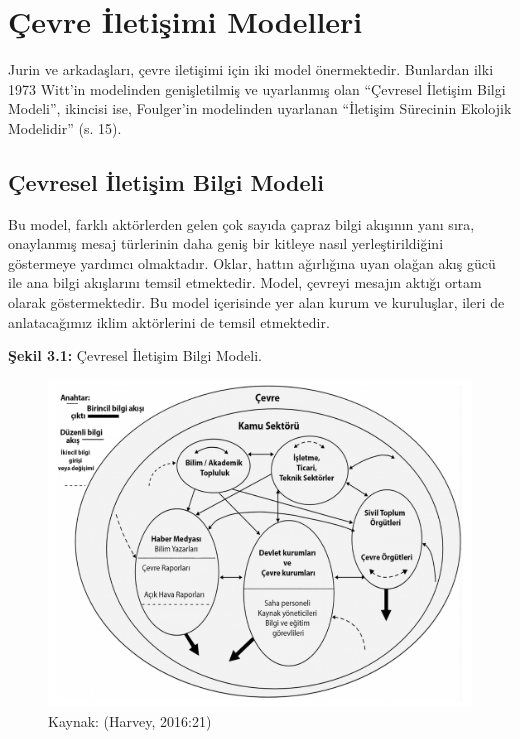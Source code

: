 \documentclass[
]{book}
\begin{document}
\hypertarget{uxe7evre-iletiux15fimi-modelleri}{%
\section{Çevre İletişimi Modelleri}\label{uxe7evre-iletiux15fimi-modelleri}}

Jurin ve arkadaşları, çevre iletişimi için iki model önermektedir. Bunlardan ilki 1973 Witt'in modelinden genişletilmiş ve uyarlanmış olan ``Çevresel İletişim Bilgi Modeli'', ikincisi ise, Foulger'in modelinden uyarlanan ``İletişim Sürecinin Ekolojik Modelidir'' (s. 15). \citep{jurin2010environmental}

\hypertarget{uxe7evresel-iletiux15fim-bilgi-modeli}{%
\subsection{Çevresel İletişim Bilgi Modeli}\label{uxe7evresel-iletiux15fim-bilgi-modeli}}

Bu model, farklı aktörlerden gelen çok sayıda çapraz bilgi akışının yanı sıra, onaylanmış mesaj türlerinin daha geniş bir kitleye nasıl yerleştirildiğini göstermeye yardımcı olmaktadır. Oklar, hattın ağırlığına uyan olağan akış gücü ile ana bilgi akışlarını temsil etmektedir. Model, çevreyi mesajın aktığı ortam olarak göstermektedir. Bu model içerisinde yer alan kurum ve kuruluşlar, ileri de anlatacağımız iklim aktörlerini de temsil etmektedir.

\textbf{Şekil 3.1:} Çevresel İletişim Bilgi Modeli.

\begin{figure}
\includegraphics[width=0.95\linewidth,height=0.95\textheight]{tablolar-sekiller/sekil-3-1} \caption{Kaynak: (Harvey, 2016:21)}\label{fig:unnamed-chunk-1}
\end{figure}
\end{document}
